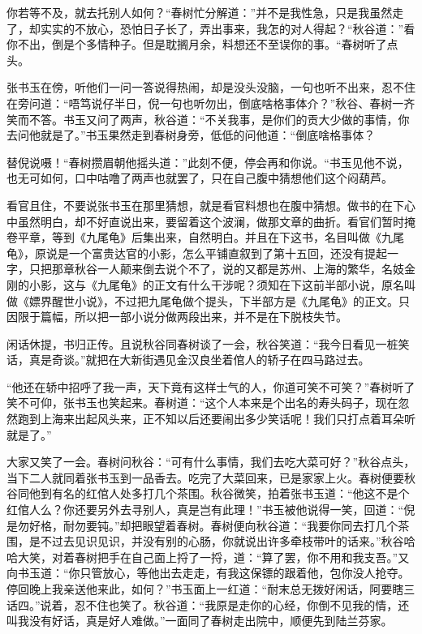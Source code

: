 \documentclass[12pt,UTF8]{ctexbook}
\begin{document}
{{{你若等不及，就去托别人如何？“春树忙分解道：”并不是我性急，只是我虽然走了，却实实的不放心，恐怕日子长了，弄出事来，我怎的对人得起？“秋谷道：”看你不出，倒是个多情种子。但是耽搁月余，料想还不至误你的事。“春树听了点头。

张书玉在傍，听他们一问一答说得热闹，却是没头没脑，一句也听不出来，忍不住在旁问道：“唔笃说仔半日，倪一句也听勿出，倒底啥格事体介？”秋谷、春树一齐笑而不答。书玉又问了两声，秋谷道：“不关我事，是你们的贡大少做的事情，你去问他就是了。”书玉果然走到春树身旁，低低的问他道：“倒底啥格事体？

替倪说嗫！“春树攒眉朝他摇头道：”此刻不便，停会再和你说。“书玉见他不说，也无可如何，口中咕噜了两声也就罢了，只在自己腹中猜想他们这个闷葫芦。

看官且住，不要说张书玉在那里猜想，就是看官料想也在腹中猜想。做书的在下心中虽然明白，却不好直说出来，要留着这个波澜，做那文章的曲折。看官们暂时掩卷平章，等到《九尾龟》后集出来，自然明白。并且在下这书，名目叫做《九尾龟》，原说是一个富贵达官的小影，怎么平铺直叙到了第十五回，还没有提起一字，只把那章秋谷一人颠来倒去说个不了，说的又都是苏州、上海的繁华，名妓金刚的小影，这与《九尾龟》的正文有什么干涉呢？须知在下这前半部小说，原名叫做《嫖界醒世小说》，不过把九尾龟做个提头，下半部方是《九尾龟》的正文。只因限于篇幅，所以把一部小说分做两段出来，并不是在下脱枝失节。

闲话休提，书归正传。且说秋谷同春树谈了一会，秋谷笑道：“我今日看见一桩笑话，真是奇谈。”就把在大新街遇见金汉良坐着倌人的轿子在四马路过去。

“他还在轿中招呼了我一声，天下竟有这样士气的人，你道可笑不可笑？”春树听了笑不可仰，张书玉也笑起来。春树道：“这个人本来是个出名的寿头码子，现在忽然跑到上海来出起风头来，正不知以后还要闹出多少笑话呢！我们只打点着耳朵听就是了。”

大家又笑了一会。春树问秋谷：“可有什么事情，我们去吃大菜可好？”秋谷点头，当下二人就同着张书玉到一品香去。吃完了大菜回来，已是家家上火。春树便要秋谷同他到有名的红倌人处多打几个茶围。秋谷微笑，拍着张书玉道：“他这不是个红倌人么？你还要另外去寻别人，真是岂有此理！”书玉被他说得一笑，回道：“倪是勿好格，耐勿要钝。”却把眼望着春树。春树便向秋谷道：“我要你同去打几个茶围，是不过去见识见识，并没有别的心肠，你就说出许多牵枝带叶的话来。”秋谷哈哈大笑，对着春树把手在自己面上捋了一捋，道：“算了罢，你不用和我支吾。”又向书玉道：“你只管放心，等他出去走走，有我这保镖的跟着他，包你没人抢夺。停回晚上我亲送他来此，如何？”书玉面上一红道：“耐末总无拨好闲话，阿要瞎三话四。”说着，忍不住也笑了。秋谷道：“我原是走你的心经，你倒不见我的情，还叫我没有好话，真是好人难做。”一面同了春树走出院中，顺便先到陆兰芬家。

}}}
\end{document}
